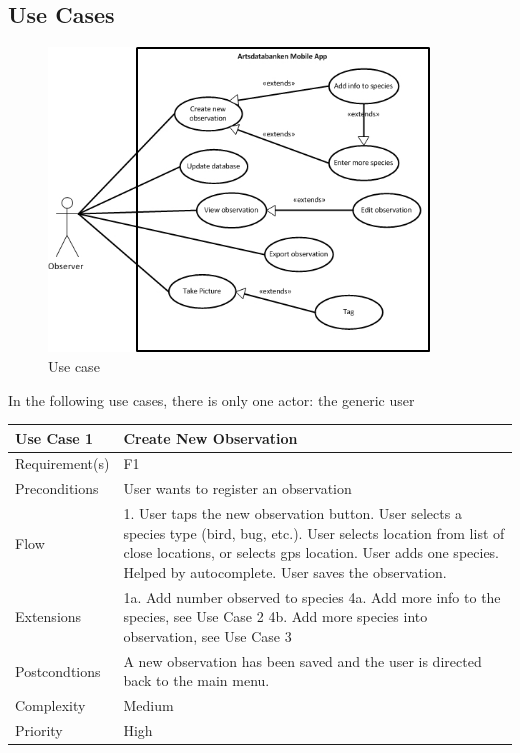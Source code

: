\subsection{Use Cases}
\begin{figure}[htb]
	\centering
	\includegraphics[width=0.9\textwidth]{reqspec/mainusecase.jpg}
	\caption{Use case}
	\label{fig:usecase}
\end{figure}

In the following use cases, there is only one actor: the generic user

\begin{tabular}[t]{|l|p{}|}\hline
	Use Case 1&Create New Observation\\\hline
	Requirement(s)&F1\\\hline
	Preconditions&User wants to register an observation\\\hline
	Flow&1. User taps the new observation button\newline
	2. User selects a species type (bird, bug, etc.)\newline
	3. User selects location from list of close locations, or selects gps location\newline
	4. User adds one species. Helped by autocomplete\newline
	5. User saves the observation.\\\hline
	Extensions& 1a. Add number observed to species\newline
	4a. Add more info to the species, see Use Case 2\newline
	4b. Add more species into observation, see Use Case 3\\\hline
	Postcondtions&A new observation has been saved and the user is directed back to the main menu.\\\hline
	Complexity&Medium\\\hline
	Priority&High\\\hline
\end{tabular}

